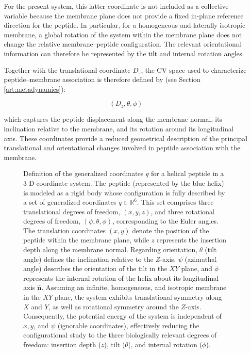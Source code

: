 For the present system, this latter coordinate is not included as a collective variable because the membrane plane does not provide a fixed in-plane reference direction for the peptide. In particular, for a homogeneous and laterally isotropic membrane, a global rotation of the system within the membrane plane does not change the relative membrane--peptide configuration. The relevant orientational information can therefore be represented by the tilt and internal rotation angles.

Together with the translational coordinate $D_z$, the CV space used to characterize peptide--membrane association is therefore defined by (see Section \ref{art:metadynamics}):

\begin{equation}
\left(D_z,\theta,\phi\right)
\end{equation}

which captures the peptide displacement along the membrane normal, its inclination relative to the membrane, and its rotation around its longitudinal axis. These coordinates provide a reduced geometrical description of the principal translational and orientational changes involved in peptide association with the membrane.


\begin{figure}[!ht]
    \centering
    
    \caption{Definition of the generalized coordinates $q$ for a helical peptide in a 3-D coordinate system.
    The peptide (represented by the blue helix) is modeled as a rigid body whose configuration is fully described by a set of generalized coordinates $q \in \mathbb{R}^6$. This set comprises three translational degrees of freedom, $(x, y, z)$, and three rotational degrees of freedom, $(\psi, \theta, \phi)$, corresponding to the Euler angles. 
    The translation coordinates $(x, y)$ denote the position of the peptide within the membrane plane, while $z$ represents the insertion depth along the membrane normal. Regarding orientation, $\theta$ (tilt angle) defines the inclination relative to the $Z$-axis, $\psi$ (azimuthal angle) describes the orientation of the tilt in the $XY$ plane, and $\phi$ represents the internal rotation of the helix about its longitudinal axis $\mathbf{\hat{n}}$. 
    Assuming an infinite, homogeneous, and isotropic membrane in the $XY$ plane, the system exhibits translational symmetry along $X$ and $Y$, as well as rotational symmetry around the $Z$-axis. Consequently, the potential energy of the system is independent of $x, y$, and $\psi$ (ignorable coordinates), effectively reducing the configurational study to the three biologically relevant degrees of freedom: insertion depth ($z$), tilt ($\theta$), and internal rotation ($\phi$).}
    \label{fig:eulers_angles}
\end{figure}



